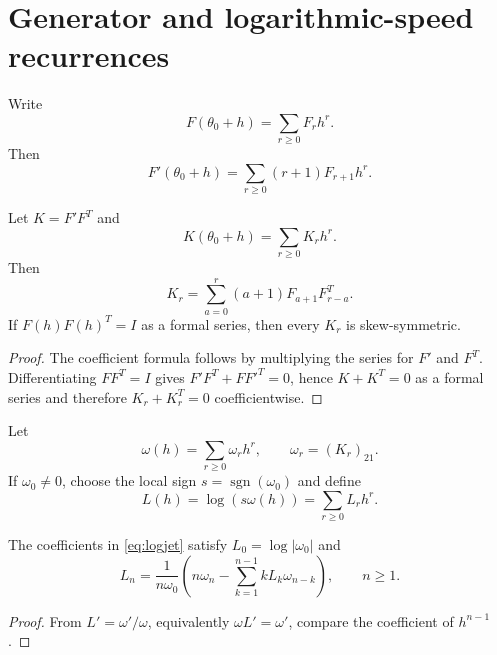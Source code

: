 \section{Generator and logarithmic-speed recurrences}
Write
\begin{equation}
F(\theta_0+h)=\sum_{r\ge0}F_rh^r.
\end{equation}
Then
\begin{equation}
F'(\theta_0+h)=\sum_{r\ge0}(r+1)F_{r+1}h^r.
\end{equation}

\begin{theorem}
\label{thm:generatorrecurrence}
Let $K=F'F^T$ and
\[
K(\theta_0+h)=\sum_{r\ge0}K_rh^r.
\]
Then
\begin{equation}
K_r=\sum_{a=0}^{r}(a+1)F_{a+1}F_{r-a}^{T}.
\label{eq:Krecurrence}
\end{equation}
If $F(h)F(h)^T=I$ as a formal series, then every $K_r$ is skew-symmetric.
\end{theorem}

\begin{proof}
The coefficient formula follows by multiplying the series for $F'$ and $F^T$.  Differentiating $FF^T=I$ gives $F'F^T+FF'^T=0$, hence $K+K^T=0$ as a formal series and therefore $K_r+K_r^T=0$ coefficientwise.
\end{proof}

Let
\begin{equation}
\omega(h)=\sum_{r\ge0}\omega_rh^r,
\qquad
\omega_r=(K_r)_{21}.
\label{eq:omegajet}
\end{equation}
If $\omega_0\ne0$, choose the local sign $s=\operatorname{sgn}(\omega_0)$ and define
\begin{equation}
L(h)=\log(s\omega(h))=\sum_{r\ge0}L_rh^r.
\label{eq:logjet}
\end{equation}

\begin{lemma}
\label{lem:logrecurrence}
The coefficients in \eqref{eq:logjet} satisfy $L_0=\log|\omega_0|$ and
\begin{equation}
L_n
=
\frac{1}{n\omega_0}
\left(
 n\omega_n-
\sum_{k=1}^{n-1}kL_k\omega_{n-k}
\right),
\qquad n\ge1.
\label{eq:logrecurrence}
\end{equation}
\end{lemma}

\begin{proof}
From $L'=\omega'/\omega$, equivalently $\omega L'=\omega'$, compare the coefficient of $h^{n-1}$.
\end{proof}

